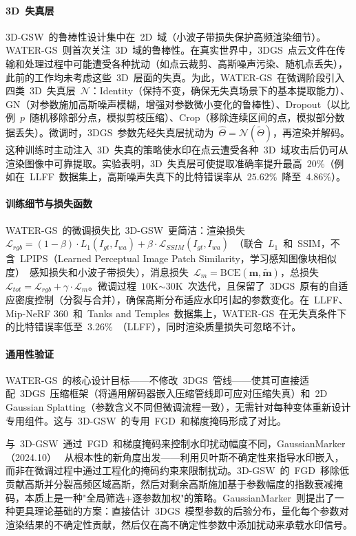 \paragraph{3D~失真层}
3D-GSW~的鲁棒性设计集中在~2D~域（小波子带损失保护高频渲染细节）。WATER-GS~则首次关注~3D~域的鲁棒性。在真实世界中，3DGS~点云文件在传输和处理过程中可能遭受各种扰动（如点云裁剪、高斯噪声污染、随机点丢失），此前的工作均未考虑这些~3D~层面的失真。为此，WATER-GS~在微调阶段引入四类~3D~失真层~$\mathcal{N}$：Identity（保持不变，确保无失真场景下的基本提取能力）、GN（对参数施加高斯噪声模糊，增强对参数微小变化的鲁棒性）、Dropout（以比例~$p$~随机移除部分点，模拟剪枝压缩）、Crop（移除连续区间的点，模拟部分数据丢失）。微调时，3DGS~参数先经失真层扰动为~$\hat{\Theta} = \mathcal{N}(\tilde{\Theta})$，再渲染并解码。这种训练时主动注入~3D~失真的策略使水印在点云遭受各种~3D~域攻击后仍可从渲染图像中可靠提取。实验表明，3D~失真层可使提取准确率提升最高~$20\%$（例如在~LLFF~数据集上，高斯噪声失真下的比特错误率从~$25.62\%$~降至~$4.86\%$）。

\paragraph{训练细节与损失函数}
WATER-GS~的微调损失比~3D-GSW~更简洁：渲染损失~$\mathcal{L}_{rgb} = (1-\beta) \cdot L_1(I_{gt}, I_{wa}) + \beta \cdot \mathcal{L}_{SSIM}(I_{gt}, I_{wa})$~（联合~$L_1$~和~SSIM，不含~LPIPS（Learned Perceptual Image Patch Similarity，学习感知图像块相似度）~感知损失和小波子带损失），消息损失~$\mathcal{L}_m = \text{BCE}(\boldsymbol{m}, \tilde{\boldsymbol{m}})$，总损失~$\mathcal{L}_{tot} = \mathcal{L}_{rgb} + \gamma \cdot \mathcal{L}_m$。微调过程~$10$K$\sim 30$K~次迭代，且保留了~3DGS~原有的自适应密度控制（分裂与合并），确保高斯分布适应水印引起的参数变化。在~LLFF、Mip-NeRF 360~和~Tanks and Temples~数据集上，WATER-GS~在无失真条件下的比特错误率低至~$3.26\%$~（LLFF），同时渲染质量损失可忽略不计。

\paragraph{通用性验证}
WATER-GS~的核心设计目标——不修改~3DGS~管线——使其可直接适配~3DGS~压缩框架（将通用解码器嵌入压缩管线即可应对压缩失真）和~2D Gaussian Splatting（参数含义不同但微调流程一致），无需针对每种变体重新设计专用组件。这与~3D-GSW~的专用~FGD~和梯度掩码形成了对比。

与~3D-GSW~通过~FGD~和梯度掩码来控制水印扰动幅度不同，GaussianMarker（2024.10）~\cite{2410_23718} 从根本性的新角度出发——利用贝叶斯不确定性来指导水印嵌入，而非在微调过程中通过工程化的掩码约束来限制扰动。3D-GSW~的~FGD~移除低贡献高斯并分裂高频区域高斯，然后对剩余高斯施加基于参数幅度的指数衰减掩码，本质上是一种"全局筛选+逐参数加权"的策略。GaussianMarker~则提出了一种更具理论基础的方案：直接估计~3DGS~模型参数的后验分布，量化每个参数对渲染结果的不确定性贡献，然后仅在高不确定性参数中添加扰动来承载水印信号。

